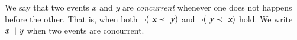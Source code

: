 We say that two events $x$ and $y$ are \emph{concurrent} whenever one does not happens before the other.
That is, when both $\neg (\isa{x} \prec \isa{y})$ and $\neg (\isa{y} \prec \isa{x})$ hold.
We write $x\ {\isasymparallel}\ y$ when two events are concurrent.

